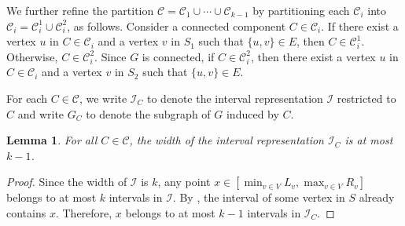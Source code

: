 \documentclass[11pt]{article}
\newtheorem{lemma}{Lemma}[section]
\theoremstyle{definition}
\theoremstyle{remark}
\begin{document}

We further refine the partition $\mathcal{C} = \mathcal{C}_1 \cup  \cdots \cup 
 \mathcal{C}_{k-1}$ by partitioning each $\mathcal{C}_i$ into $\mathcal{C}_i = \mathcal{C}_i^1 \cup \mathcal{C}_i^2$, as follows. Consider a connected component $C \in \mathcal{C}_i$.  If there exist a vertex $u$ in $C \in \mathcal{C}_i$ and a vertex $v$ in $S_1$ such that $\{u,v\}\in E$, then $C \in \mathcal{C}_i^1$. Otherwise,  $C \in \mathcal{C}_i^2$. Since $G$ is connected, if $C \in \mathcal{C}_i^2$, then there exist a vertex $u$ in $C \in \mathcal{C}_i$ and a vertex $v$ in $S_2$ such that $\{u,v\}\in E$. 



For each $C \in \mathcal{C}$, we write $\mathcal{I}_C$ to denote the interval representation $\mathcal{I}$ restricted to $C$ and write $G_C$ to denote the subgraph of $G$ induced by $C$.

\begin{lemma}
    \label{induct-partition-component}
    For all $C \in \mathcal{C}$, the width of the interval representation $\mathcal{I}_C$ is at most $k-1$.
\end{lemma}
\begin{proof}
Since the width of $\mathcal{I}$ is $k$, any point $x \in [\min_{v \in V} L_v, \max_{v \in V} R_v]$  belongs to at most $k$ intervals in $\mathcal{I}$.
By , the interval of some vertex in $S$
already contains $x$. Therefore, $x$ belongs to at most $k-1$ intervals in $\mathcal{I}_C$.  
\end{proof}
\end{document}
